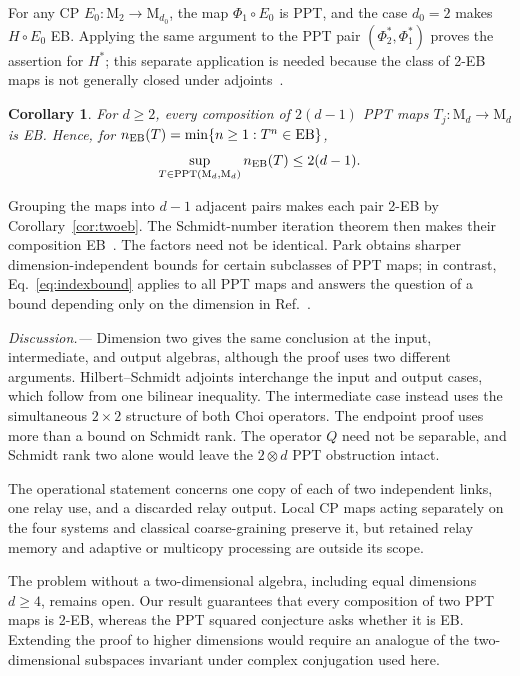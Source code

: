 \documentclass[aps,prl,reprint,superscriptaddress,nofootinbib]{revtex4-2}
\newcommand{\M}{\mathrm{M}}
\newcommand{\PPT}{\operatorname{PPT}}
\newcommand{\EB}{\operatorname{EB}}
\newtheorem{corollary}[theorem]{Corollary}
\begin{document}
For any CP $E_0:\M_2\to\M_{d_0}$, the map $\Phi_1\circ E_0$ is PPT, and
the case $d_0=2$ makes $H\circ E_0$ EB.  Applying the same argument to the
PPT pair $(\Phi_2^*,\Phi_1^*)$ proves the assertion for $H^*$; this separate
application is needed because the class of 2-EB maps is not generally closed under
adjoints~\cite[Theorem~3.17]{Devendra2023}.

\begin{corollary}
\label{cor:index}
For $d\geq2$, every composition of $2(d-1)$ PPT maps
$T_j:\M_d\to\M_d$ is EB.  Hence, for
$n_{\rm EB}(T)=\min\{n\geq1:T^n\in\EB\}$,
\begin{equation}
 \sup_{T\in\PPT(\M_d,\M_d)}n_{\rm EB}(T)\leq2(d-1).
\label{eq:indexbound}
\end{equation}
\end{corollary}

Grouping the maps into $d-1$ adjacent pairs makes each pair 2-EB by
Corollary~\ref{cor:twoeb}.  The Schmidt-number iteration theorem then makes
their composition EB~\cite[Theorem~II.1]{Christandl2019}.  The factors need
not be identical.  Park obtains sharper dimension-independent bounds for
certain subclasses of PPT maps; in contrast,
Eq.~\eqref{eq:indexbound} applies to all PPT maps and answers the question of
a bound depending only on the dimension in
Ref.~\cite[Question~4.3]{Park2026}.

\textit{Discussion.---}
Dimension two gives the same conclusion at the input, intermediate, and
output algebras, although the proof uses two different arguments.
Hilbert--Schmidt adjoints interchange the
input and output cases, which follow from one bilinear inequality.  The
intermediate case instead uses the simultaneous $2\times2$ structure of both
Choi operators.  The endpoint proof uses more than a bound on Schmidt rank.
The operator $Q$ need not be separable, and Schmidt rank two alone would leave
the $2\otimes d$ PPT obstruction intact.

The operational statement concerns one copy of each of two independent
links, one relay use, and a discarded relay output.  Local CP maps acting
separately on the four systems and classical coarse-graining preserve it, but retained relay
memory and adaptive or multicopy processing are outside its scope.

The problem without a two-dimensional algebra, including equal dimensions
$d\geq4$, remains open.  Our result guarantees that every composition of two
PPT maps is 2-EB, whereas the PPT squared conjecture asks whether it is EB.
Extending the proof to higher dimensions would require an analogue of the
two-dimensional subspaces invariant under complex conjugation used here.
\end{document}
